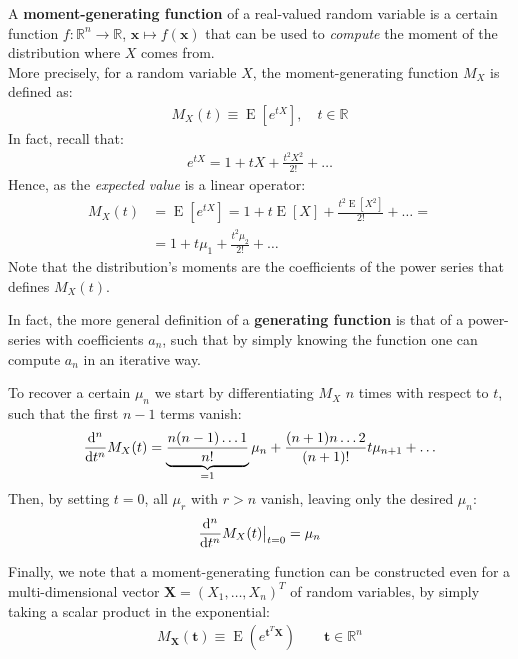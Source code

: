 \documentclass[../template.tex]{subfiles}
\begin{document}
A \textbf{moment-generating function} of a real-valued random variable is a certain function $f \colon \mathbb{R}^n \to \mathbb{R}$, $\bm{x} \mapsto f(\bm{x})$ that can be used to \textit{compute} the moment of the distribution where $X$ comes from.\\
More precisely, for a random variable $X$, the moment-generating function $M_X$ is defined as:
\begin{align*}
    M_X(t) \equiv \operatorname{E}[e^{tX}], \quad t \in \mathbb{R} 
\end{align*}
In fact, recall that:
\begin{align*}
    e^{tX} = 1 + tX + \frac{t^2 X^2}{2!} + \dots 
\end{align*}
Hence, as the \textit{expected value} is a linear operator: 
\begin{align*}
    M_X(t) &= \operatorname{E}[e^{tX}] = 1+ t \operatorname{E}[X] + \frac{t^2 \operatorname{E}[X^2]}{2!} + \dots =\\
    &= 1 + t \mu_1 + \frac{t^2 \mu_2}{2!} + \dots
\end{align*}
Note that the distribution's moments are the coefficients of the power series that defines $M_X(t)$.

\begin{expl}
    In fact, the more general definition of a \textbf{generating function} is that of a power-series with  coefficients $a_n$, such that by simply knowing the function one can compute $a_n$ in an iterative way.   
\end{expl}

To recover a certain $\mu_n$ we start by differentiating $M_X$ $n$ times with respect to $t$, such that the first $n-1$ terms vanish:
\begin{align*}
    \dv[n]{t} M_X(t) = \underbrace{\frac{n(n-1)\dots 1}{n!}}_{=1} \mu_n + \frac{(n+1)n\dots 2}{(n+1)!} t \mu_{n+1} + \dots   
\end{align*}    
Then, by setting $t=0$, all $\mu_r$ with $r>n$ vanish, leaving only the desired $\mu_n$:  
\begin{align*}
    \dv[n]{t} M_X(t) \big|_{t=0} = \mu_n
\end{align*}   

Finally, we note that a moment-generating function can be constructed even for a multi-dimensional vector $\bm{X} = (X_1, \dots, X_n)^T$ of random variables, by simply taking a scalar product in the exponential:
\begin{align*}
    M_{\bm{X}}(\bm{t}) \equiv \operatorname{E}\left(e^{\bm{t}^T \bm{X}}\right) \qquad \bm{t} \in \mathbb{R}^n
\end{align*} 
\end{document}

